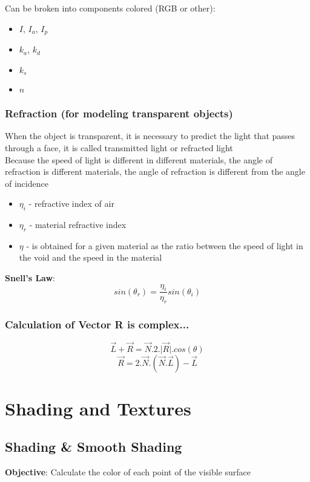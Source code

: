 \documentclass[a4paper]{article}
\begin{document}
\begin{flushleft}
Can be broken into components colored (RGB or other):
\begin{itemize}
	\item $I$, $I_a$, $I_p$
	\item $k_a$, $k_d$
	\item $k_s$
	\item $n$
\end{itemize}

\subsubsection{Refraction (for modeling transparent objects)}
When the object is transparent, it is necessary to predict the light that passes through a face, it is called transmitted light or refracted light\\
Because the speed of light is different in different materials, the angle of refraction is different materials, the angle of refraction is different from the angle of incidence

\begin{itemize}
	\item $\eta_i$ - refractive index of air
	\item $\eta_r$ - material refractive index
	\item $\eta$ - is obtained for a given material as the ratio between the speed of light in the void and the speed in the material
\end{itemize}

\textbf{Snell's Law}:
\begin{equation}
	sin(\theta_r) = \frac{\eta_i}{\eta_r}sin(\theta_i)
\end{equation}

\subsubsection{Calculation of Vector R is complex...}
\begin{equation}
	\vec{L} + \vec{R} = \vec{N}.2.\vert\vec{R}\vert.cos(\theta)
\end{equation}
\begin{equation}
	\vec{R} = 2.\vec{N}.(\vec{N}.\vec{L})-\vec{L}
\end{equation}

\section{Shading and Textures}

\subsection{Shading \& Smooth Shading}
\textbf{Objective}: Calculate the color of each point of the visible surface


\end{flushleft}
\end{document}
